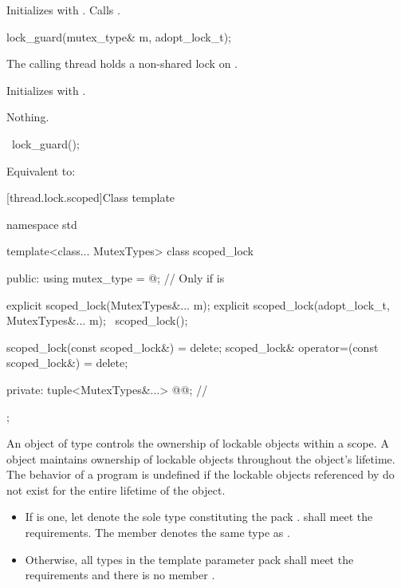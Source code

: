 \begin{itemdescr}
\pnum
\effects
Initializes  with . Calls .
\end{itemdescr}

%
\begin{itemdecl}
lock_guard(mutex_type& m, adopt_lock_t);
\end{itemdecl}

\begin{itemdescr}
\pnum
\expects
The calling thread holds a non-shared lock on .

\pnum
\effects
Initializes  with .

\pnum
\throws
Nothing.
\end{itemdescr}

%
\begin{itemdecl}
~lock_guard();
\end{itemdecl}

\begin{itemdescr}
\pnum
\effects
Equivalent to: 
\end{itemdescr}

[thread.lock.scoped]{Class template }

%
\begin{codeblock}
namespace std {
  template<class... MutexTypes>
  class scoped_lock {
  public:
    using mutex_type = @\seebelow@;     // Only if  is 

    explicit scoped_lock(MutexTypes&... m);
    explicit scoped_lock(adopt_lock_t, MutexTypes&... m);
    ~scoped_lock();

    scoped_lock(const scoped_lock&) = delete;
    scoped_lock& operator=(const scoped_lock&) = delete;

  private:
    tuple<MutexTypes&...> @@;   // \expos
  };
}
\end{codeblock}

\pnum
An object of type  controls the ownership of lockable objects
within a scope. A  object maintains ownership of lockable
objects throughout the  object's lifetime.
The behavior of a program is undefined if the lockable objects referenced by
 do not exist for the entire lifetime of the 
object.
\begin{itemize}
\item
If  is one,
let  denote the sole type constituting the pack .
shall meet the  requirements.
The member  
denotes the same type as .
\item
Otherwise, all types in the template parameter pack 
shall meet the  requirements
and there is no member .
\end{itemize}

